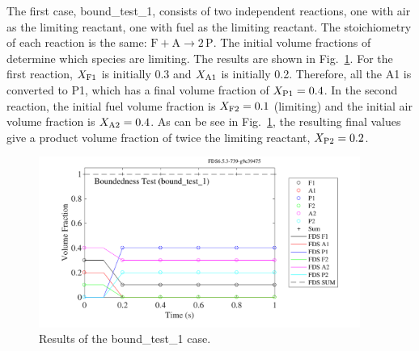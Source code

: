 \documentclass[11pt]{book}
\begin{document}
The first case, {\ct bound\_test\_1}, consists of two independent reactions, one with air as the limiting reactant, one with fuel as the limiting reactant.  The stoichiometry of each reaction is the same: $\mathrm{F} + \mathrm{A} \rightarrow 2\,\mathrm{P}$.  The initial volume fractions of determine which species are limiting.  The results are shown in Fig.~\ref{fig:bound_test_1}.  For the first reaction, $X_{\rm F1}$ is initially 0.3 and $X_{\rm A1}$ is initially 0.2.  Therefore, all the A1 is converted to P1, which has a final volume fraction of $X_{\rm P1}=0.4$.  In the second reaction, the initial fuel volume fraction is $X_{\rm F2}=0.1$ (limiting) and the initial air volume fraction is $X_{\rm A2}=0.4$.  As can be see in Fig.~\ref{fig:bound_test_1}, the resulting final values give a product volume fraction of twice the limiting reactant, $X_{\rm P2}=0.2$.

\begin{figure}[!ht]
   \centering
   \includegraphics[height=2.2in]{SCRIPT_FIGURES/bound_test_1}
   \caption[Results of the {\ct bound\_test\_1} case]{Results of the {\ct bound\_test\_1} case.}
   \label{fig:bound_test_1}
\end{figure}
\end{document}

